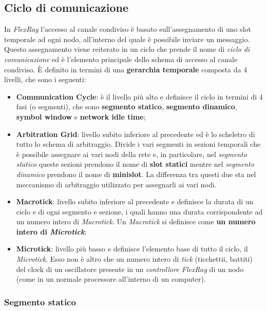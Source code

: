 \subsection{Ciclo di comunicazione}
In \emph{FlexRay} l'accesso al canale condiviso è basato sull'assegnamento di uno slot temporale ad ogni nodo, all'interno del quale è possibile inviare un messaggio. Questo assegnamento viene reiterato in un ciclo che prende il nome di \emph{ciclo di comunicazione} ed è l'elemento principale dello schema di accesso al canale condiviso. È definito in termini di una \textbf{gerarchia temporale} composta da 4 livelli, che sono i seguenti:
\begin{itemize}
    \item \textbf{Communication Cycle}: è il livello più alto e definisce il ciclo in termini di 4 fasi (o segmenti), che sono \textbf{segmento statico}, \textbf{segmento dinamico}, \textbf{symbol window} e \textbf{network idle time};
    \item \textbf{Arbitration Grid}: livello subito inferiore al precedente ed è lo scheletro di tutto lo schema di arbitraggio. Divide i vari segmenti in sezioni temporali che è possibile assegnare ai vari nodi della rete e, in particolare, nel \emph{segmento statico} queste sezioni prendono il nome di \textbf{slot statici} mentre nel \emph{segmento dinamico} prendono il nome di \textbf{minislot}. La differenza tra questi due sta nel meccanismo di arbitraggio utilizzato per assegnarli ai vari nodi. 
    \item \textbf{Macrotick}: livello subito inferiore al precedente e definisce la durata di un ciclo e di ogni segmento e sezione, i quali hanno una durata corrispondente ad un numero intero di \emph{Macrotick}. Un \emph{Macrotick} si definisce come \textbf{un numero intero di \emph{Microtick}};
    \item \textbf{Microtick}: livello più basso e definisce l'elemento base di tutto il ciclo, il \emph{Microtick}. Esso non è altro che un numero intero di \emph{tick} (ticchettii, battiti) del clock di un oscillatore presente in un \emph{controllore FlexRay} di un nodo (come in un normale processore all'interno di un computer).
\end{itemize}

\subsubsection{Segmento statico}

